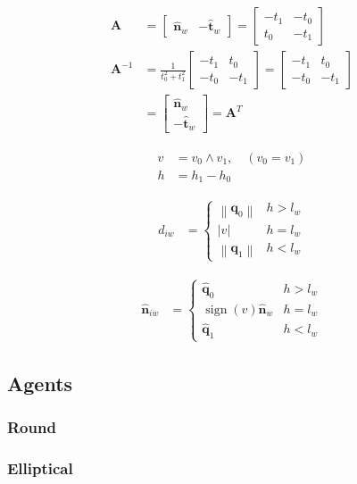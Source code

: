 \begin{align}
\mathbf{A} 
&= \begin{bmatrix} \hat{\mathbf{n}}_{w} & -\hat{\mathbf{t}}_{w} \end{bmatrix} 
= \left[\begin{matrix}- t_{1} & - t_{0}\\t_{0} & - t_{1}\end{matrix}\right] \\
\mathbf{A}^{-1} 
&= \frac{1}{t_{0}^{2} + t_{1}^{2}} \left[\begin{matrix}- t_{1} & t_{0}\\- t_{0} & - t_{1}\end{matrix}\right]
= \left[\begin{matrix}- t_{1} & t_{0}\\- t_{0} & - t_{1}\end{matrix}\right] \\
&= \begin{bmatrix} \hat{\mathbf{n}}_{w} \\ -\hat{\mathbf{t}}_{w} \end{bmatrix} = \mathbf{A}^{T}
\end{align}

\begin{align}
v &= v_{0} \wedge v_{1},\quad (v_{0} = v_{1}) \\
h &= h_{1} - h_{0}
\end{align}

\begin{align}
d_{iw} &=
\begin{cases}
\left\|\mathbf{q}_{0}\right\| & h > l_{w} \\
\left|v\right| & h = l_{w} \\
\left\|\mathbf{q}_{1}\right\| & h < l_{w}
\end{cases}
\end{align}

\begin{align}
\hat{\mathbf{n}}_{iw} &=
\begin{cases}
\hat{\mathbf{q}}_{0} & h > l_{w} \\
\operatorname{sign}(v)\hat{\mathbf{n}}_{w} & h = l_{w} \\
\hat{\mathbf{q}}_{1} & h < l_{w}
\end{cases}
\end{align}


\subsection{Agents}
\subsubsection{Round}
\subsubsection{Elliptical}


